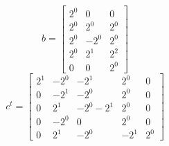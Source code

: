 \documentclass{article}%
\begin{document}
\[%
b = \left[\begin{matrix}2^{0} & 0 & 0\\2^{0} & 2^{0} & 2^{0}\\2^{0} & - 2^{0} & 2^{0}\\2^{0} & 2^{1} & 2^{2}\\0 & 0 & 2^{0}\end{matrix}\right]%
\]%
\[%
c^{t} = \left[\begin{matrix}2^{1} & - 2^{0} & - 2^{1} & 2^{0} & 0\\0 & - 2^{1} & - 2^{0} & 2^{0} & 0\\0 & 2^{1} & - 2^{0} - 2^{1} & 2^{0} & 0\\0 & - 2^{0} & 0 & 2^{0} & 0\\0 & 2^{1} & - 2^{0} & - 2^{1} & 2^{0}\end{matrix}\right]%
\]%
\end{document}
